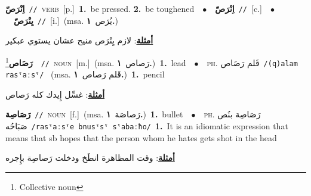 \documentclass[10pt,a4paper,twoside]{article} %
\begin{document}
\begin{multicols}{2}
{\setlength\topsep{0pt}\textbf{\foreignlanguage{arabic}{اِنْرَصّ}}\ {\color{gray}\texttt{//}\color{black}}\ \textsc{verb}\ [p.]\ \textbf{1.}~be pressed.  \textbf{2.}~be toughened\ \ $\bullet$\ \ \setlength\topsep{0pt}\textbf{\foreignlanguage{arabic}{اِنْرَصّ}}\ {\color{gray}\texttt{//}\color{black}}\ [c.]\ \ $\bullet$\ \ \setlength\topsep{0pt}\textbf{\foreignlanguage{arabic}{يِنْرَصّ}}\ {\color{gray}\texttt{//}\color{black}}\ [i.]\ \color{gray}(msa. \foreignlanguage{arabic}{يُرَص}~\foreignlanguage{arabic}{\textbf{١.}})\color{black}\  \begin{flushright}\color{gray}\foreignlanguage{arabic}{\textbf{\underline{\foreignlanguage{arabic}{أمثلة}}}: لازم يِنْرَص منيح عشان يستوي عبكير}\end{flushright}\color{black}} \vspace{2mm}

{\setlength\topsep{0pt}\textbf{\foreignlanguage{arabic}{رَصَاص}}\footnote{Collective noun}\ \ {\color{gray}\texttt{//}\color{black}}\ \textsc{noun}\ [m.]\ \color{gray}(msa. \foreignlanguage{arabic}{رَصاص}~\foreignlanguage{arabic}{\textbf{١.}})\color{black}\ \textbf{1.}~lead\ \ $\bullet$\ \ \textsc{ph.} \color{gray} \foreignlanguage{arabic}{قَلم رَصَاص}\color{black}\ {\color{gray}\texttt{/{\sffamily (q)alam rasˤaːsˤ}/}\color{black}}\ \color{gray} (msa. \foreignlanguage{arabic}{قَلم رَصاص}~\foreignlanguage{arabic}{\textbf{١.}})\color{black}\ \textbf{1.}~pencil\  \begin{flushright}\color{gray}\foreignlanguage{arabic}{\textbf{\underline{\foreignlanguage{arabic}{أمثلة}}}: غسِّل إِيدك كله رَصاص}\end{flushright}\color{black}} \vspace{2mm}

{\setlength\topsep{0pt}\textbf{\foreignlanguage{arabic}{رَصَاصِة}}\ {\color{gray}\texttt{//}\color{black}}\ \textsc{noun}\ [f.]\ \color{gray}(msa. \foreignlanguage{arabic}{رَصاصَة}~\foreignlanguage{arabic}{\textbf{١.}})\color{black}\ \textbf{1.}~bullet\ \ $\bullet$\ \ \textsc{ph.} \color{gray} \foreignlanguage{arabic}{رَصَاصِة بنُص صَبَاحُه}\color{black}\ {\color{gray}\texttt{/{\sffamily rasˤaːsˤe bnusˤsˤ sˤabaːħo}/}\color{black}}\ \textbf{1.}~It is an idiomatic expression that means that sb hopes that the person whom he hates gets shot in the head\  \begin{flushright}\color{gray}\foreignlanguage{arabic}{\textbf{\underline{\foreignlanguage{arabic}{أمثلة}}}: وقت المظاهرة انطَخ ودخلت رَصاصِة بإِجره}\end{flushright}\color{black}} \vspace{2mm}


\end{multicols}
\end{document}
